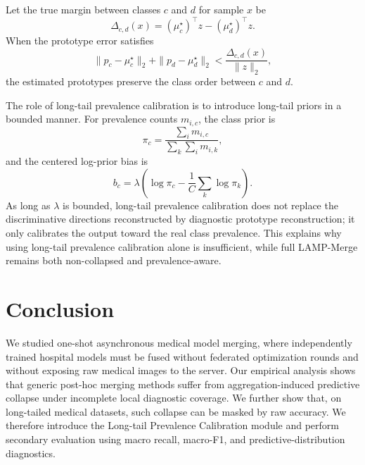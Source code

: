 \documentclass[letterpaper]{article} %
\begin{document}
Let the true margin between classes $c$ and $d$ for sample $x$ be
\begin{equation}
\Delta_{c,d}(x)=(\mu_c^\star)^\top z-(\mu_d^\star)^\top z.
\end{equation}
When the prototype error satisfies
\begin{equation}
\|p_c-\mu_c^\star\|_2+\|p_d-\mu_d^\star\|_2
<
\frac{\Delta_{c,d}(x)}{\|z\|_2},
\end{equation}
the estimated prototypes preserve the class order between $c$ and $d$.

The role of long-tail prevalence calibration is to introduce long-tail priors in a bounded manner. For prevalence counts $m_{i,c}$, the class prior is
\begin{equation}
\pi_c=\frac{\sum_i m_{i,c}}{\sum_k \sum_i m_{i,k}},
\end{equation}
and the centered log-prior bias is
\begin{equation}
b_c=\lambda\left(\log\pi_c-\frac{1}{C}\sum_k\log\pi_k\right).
\end{equation}
As long as $\lambda$ is bounded, long-tail prevalence calibration does not replace the discriminative directions reconstructed by diagnostic prototype reconstruction; it only calibrates the output toward the real class prevalence. This explains why using long-tail prevalence calibration alone is insufficient, while full LAMP-Merge remains both non-collapsed and prevalence-aware.

\section{Conclusion}

We studied one-shot asynchronous medical model merging, where independently trained hospital models must be fused without federated optimization rounds and without exposing raw medical images to the server. Our empirical analysis shows that generic post-hoc merging methods suffer from aggregation-induced predictive collapse under incomplete local diagnostic coverage. We further show that, on long-tailed medical datasets, such collapse can be masked by raw accuracy. We therefore introduce the Long-tail Prevalence Calibration module and perform secondary evaluation using macro recall, macro-F1, and predictive-distribution diagnostics.
\end{document}
